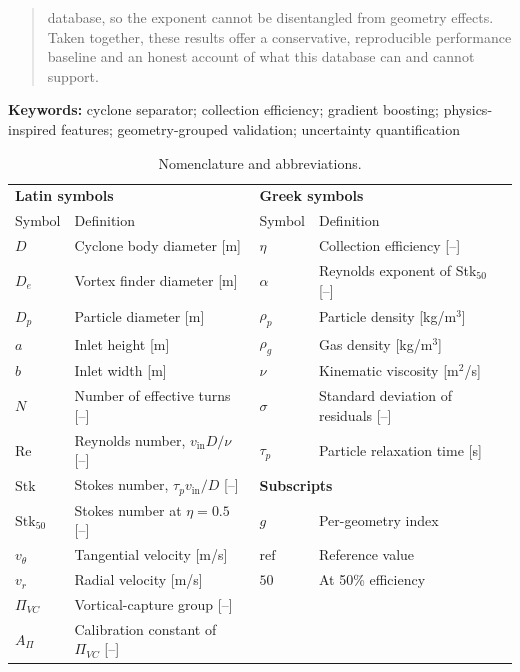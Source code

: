 \documentclass[12pt]{article}
\newcommand{\Stk}{\mathrm{Stk}}
\newcommand{\Rey}{\mathrm{Re}}
\newcommand{\PiVC}{\Pi_{VC}}
\begin{document}
\begin{abstract}
database, so the exponent cannot be disentangled from geometry effects. Taken together, these results offer a conservative, reproducible performance baseline and an honest account of what this database can and cannot support.
\end{abstract}

\noindent\textbf{Keywords:} cyclone separator; collection efficiency; gradient boosting; physics-inspired features; geometry-grouped validation; uncertainty quantification

\begin{table}[!ht]\centering
\caption{Nomenclature and abbreviations.}\label{tab:nomenclature}
\small
\begin{tabular}{llll}
\toprule
\multicolumn{2}{l}{\textbf{Latin symbols}} & \multicolumn{2}{l}{\textbf{Greek symbols}} \\
\cmidrule(lr){1-2}\cmidrule(lr){3-4}
Symbol & Definition & Symbol & Definition \\
\midrule
$D$ & Cyclone body diameter [m] & $\eta$ & Collection efficiency [--] \\
$D_e$ & Vortex finder diameter [m] & $\alpha$ & Reynolds exponent of Stk$_{50}$ [--] \\
$D_p$ & Particle diameter [m] & $\rho_p$ & Particle density [kg/m$^3$] \\
$a$ & Inlet height [m] & $\rho_g$ & Gas density [kg/m$^3$] \\
$b$ & Inlet width [m] & $\nu$ & Kinematic viscosity [m$^2$/s] \\
$N$ & Number of effective turns [--] & $\sigma$ & Standard deviation of residuals [--] \\
$\Rey$ & Reynolds number, $v_\text{in}D/\nu$ [--] & $\tau_p$ & Particle relaxation time [s] \\
$\Stk$ & Stokes number, $\tau_p v_\text{in}/D$ [--] & \multicolumn{2}{l}{\textbf{Subscripts}} \\
$\Stk_{50}$ & Stokes number at $\eta=0.5$ [--] & $g$ & Per-geometry index \\
$v_\theta$ & Tangential velocity [m/s] & $\text{ref}$ & Reference value \\
$v_r$ & Radial velocity [m/s] & $50$ & At 50\% efficiency \\
$\PiVC$ & Vortical-capture group [--] & & \\
$A_\Pi$ & Calibration constant of $\PiVC$ [--] & & \\

\end{tabular}
\end{table}
\end{document}
